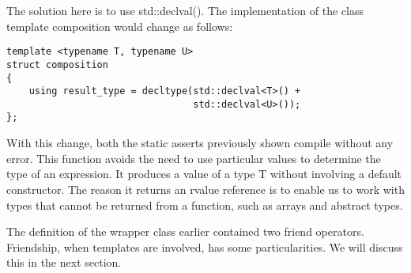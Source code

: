 The solution here is to use std::declval(). The implementation of the class template composition would change as follows:

\begin{lstlisting}[style=styleCXX]
template <typename T, typename U>
struct composition
{
	using result_type = decltype(std::declval<T>() +
								 std::declval<U>());
};
\end{lstlisting}

With this change, both the static asserts previously shown compile without any error. This function avoids the need to use particular values to determine the type of an expression. It produces a value of a type T without involving a default constructor. The reason it returns an rvalue reference is to enable us to work with types that cannot be returned from a function, such as arrays and abstract types.

The definition of the wrapper class earlier contained two friend operators. Friendship, when templates are involved, has some particularities. We will discuss this in the next section.

















